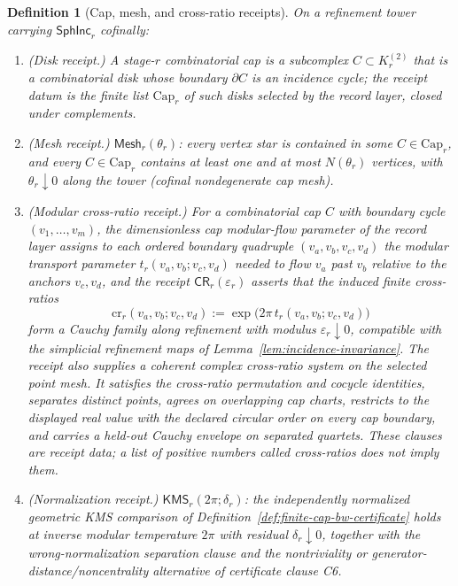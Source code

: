 \documentclass[11pt]{article}
\newtheorem{definition}[theorem]{Definition}
\begin{document}
\begin{definition}[Cap, mesh, and cross-ratio receipts]
\label{def:cap-mesh-crossratio-receipts}
On a refinement tower carrying \(\mathsf{SphInc}_r\) cofinally:
\begin{enumerate}[leftmargin=2em]
\item (\emph{Disk receipt.}) A stage-\(r\) \emph{combinatorial cap} is a
subcomplex \(C\subset K^{(2)}_r\) that is a combinatorial disk whose boundary
\(\partial C\) is an incidence cycle; the receipt datum is the finite list
\(\mathrm{Cap}_r\) of such disks selected by the record layer, closed under
complements.
\item (\emph{Mesh receipt.}) \(\mathsf{Mesh}_r(\theta_r)\): every vertex star
is contained in some \(C\in\mathrm{Cap}_r\), and every \(C\in\mathrm{Cap}_r\)
contains at least one and at most \(N(\theta_r)\) vertices, with
\(\theta_r\downarrow0\) along the tower (cofinal nondegenerate cap mesh).
\item (\emph{Modular cross-ratio receipt.}) For a combinatorial cap \(C\) with
boundary cycle \((v_1,\ldots,v_m)\), the dimensionless cap modular-flow parameter
of the record layer assigns to each ordered boundary quadruple
\((v_a,v_b,v_c,v_d)\) the modular transport parameter
\(t_r(v_a,v_b;v_c,v_d)\) needed to flow \(v_a\) past \(v_b\)
relative to the anchors \(v_c,v_d\), and the receipt
\(\mathsf{CR}_r(\varepsilon_r)\) asserts that the induced finite cross-ratios
\[
\mathrm{cr}_r(v_a,v_b;v_c,v_d):=\exp\bigl(2\pi\,t_r(v_a,v_b;v_c,v_d)\bigr)
\]
form a Cauchy family along refinement with modulus \(\varepsilon_r\downarrow0\),
compatible with the simplicial refinement maps of
Lemma~\ref{lem:incidence-invariance}. The receipt also supplies a coherent
complex cross-ratio system on the selected point mesh. It satisfies the
cross-ratio permutation and cocycle identities, separates distinct points,
agrees on overlapping cap charts, restricts to the displayed real value with
the declared circular order on every cap boundary, and carries a held-out
Cauchy envelope on separated quartets. These clauses are receipt data; a list
of positive numbers called cross-ratios does not imply them.
\item (\emph{Normalization receipt.}) \(\mathsf{KMS}_r(2\pi;\delta_r)\): the
independently normalized geometric KMS comparison of
Definition~\ref{def:finite-cap-bw-certificate} holds at inverse modular
temperature \(2\pi\) with residual \(\delta_r\downarrow0\), together with the
wrong-normalization separation clause and the nontriviality or
generator-distance/noncentrality alternative of certificate clause C6.

\end{enumerate}
\end{definition}
\end{document}

